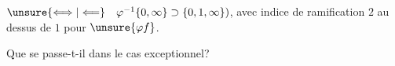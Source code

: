 $\unsure{\Longleftrightarrow|\Longleftarrow}\quad\varphi^{-1}\{0,\infty\}\supset\{0,1,\infty\})$,
avec indice de
ramification $2$ au dessus de $1$ pour $\unsure{\varphi f}$.

 Que se passe-t-il dans le cas exceptionnel?
